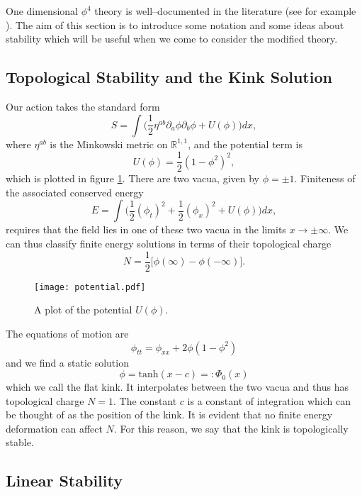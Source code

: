 One dimensional $\phi^4$ theory is well--documented in the literature (see for example \cite{Manton&Sutcliffe}). The aim of this section is to introduce some notation and some ideas about stability which will be useful when we come to consider the modified theory.

\subsection{Topological Stability and the Kink Solution}
Our action takes the standard form
\[
S=\int\bigg( \frac{1}{2}\eta^{ab}\partial_a\phi\partial_b\phi + U(\phi)\bigg)dx,
\]
where $\eta^{ab}$ is the Minkowski metric on $\mathbb{R}^{1,1}$, and the potential term is
\[
U(\phi)=\frac{1}{2}(1-\phi^2)^2,
\]
which is plotted in figure \ref{fig:potential}. There are two vacua, given by $\phi=\pm 1$. Finiteness of the associated conserved energy
\[
E = \int \bigg( \frac{1}{2}(\phi_t)^2 + \frac{1}{2}(\phi_x)^2 + U(\phi) \bigg)dx,
\]
requires that the field lies in one of these two vacua in the limits $x\rightarrow \pm \infty$. We can thus classify finite energy solutions in terms of their topological charge
\begin{equation}
\label{eq:N}
N = \frac{1}{2}\big[\phi(\infty) -\phi(-\infty)\big].
\end{equation}


\begin{figure}
\texttt{[image: potential.pdf]}
\caption{\label{fig:potential}A plot of the potential $U(\phi)$.}
\end{figure}

The equations of motion are
\begin{equation}
\label{eom:R11}
\phi_{tt}=\phi_{xx} + 2\phi(1-\phi^2)
\end{equation}
and we find a static solution
\begin{equation}
\label{eq:tanh}
\phi=\mathrm{tanh}(x-c)=:\Phi_0(x)
\end{equation}
which we call the flat kink. It interpolates between the two vacua and thus has topological charge $N=1$. The constant $c$ is a constant of integration which can be thought of as the position of the kink. It is evident that no finite energy deformation can affect $N$. For this reason, we say that the kink is topologically stable.

\subsection{Linear Stability}


